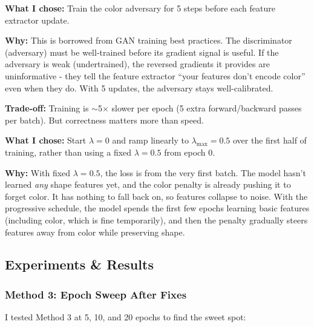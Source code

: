 \documentclass[9pt,a4paper,twocolumn,twoside]{tau-class/tau}
\begin{document}
        \begin{tauenv}[frametitle={Decision: 5 Adversary Updates Per Main Update}]
            \textbf{What I chose:} Train the color adversary for 5 steps before each feature extractor update.

            \textbf{Why:} This is borrowed from GAN training best practices. The discriminator (adversary) must be well-trained before its gradient signal is useful. If the adversary is weak (undertrained), the reversed gradients it provides are uninformative - they tell the feature extractor ``your features don't encode color'' even when they do. With 5 updates, the adversary stays well-calibrated.

            \textbf{Trade-off:} Training is $\sim$5$\times$ slower per epoch (5 extra forward/backward passes per batch). But correctness matters more than speed.
        \end{tauenv}

        \begin{tauenv}[frametitle={Decision: Progressive $\lambda$ Schedule for Method 4}]
            \textbf{What I chose:} Start $\lambda = 0$ and ramp linearly to $\lambda_{\max} = 0.5$ over the first half of training, rather than using a fixed $\lambda = 0.5$ from epoch 0.

            \textbf{Why:} With fixed $\lambda = 0.5$, the loss is  from the very first batch. The model hasn't learned \textit{any} shape features yet, and the color penalty is already pushing it to forget color. It has nothing to fall back on, so features collapse to noise. With the progressive schedule, the model spends the first few epochs learning basic features (including color, which is fine temporarily), and then the penalty gradually steers features away from color while preserving shape.
        \end{tauenv}

    \subsection{Experiments \& Results}

        \subsubsection{Method 3: Epoch Sweep After Fixes}

        I tested Method 3 at 5, 10, and 20 epochs to find the sweet spot:
\end{document}
